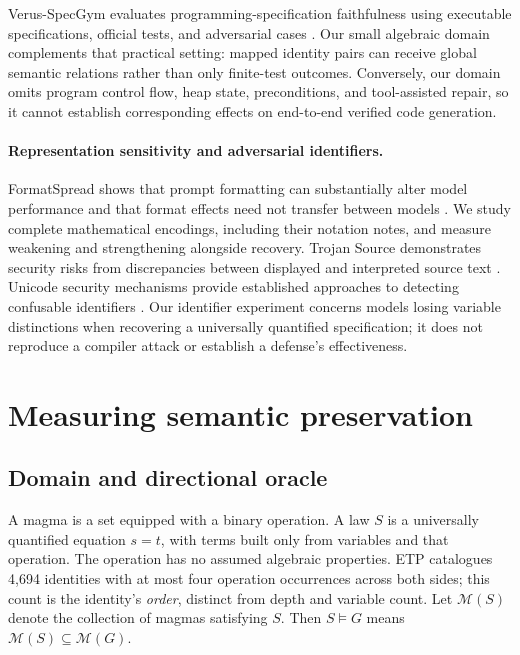 \documentclass{article}
\begin{document}
Verus-SpecGym evaluates programming-specification faithfulness using executable
specifications, official tests, and adversarial cases
\citep{agarwal2026specgym}. Our small algebraic domain complements that practical
setting: mapped identity pairs can receive global semantic relations rather
than only finite-test outcomes. Conversely, our domain omits program control
flow, heap state, preconditions, and tool-assisted repair, so it cannot establish
corresponding effects on end-to-end verified code generation.

\paragraph{Representation sensitivity and adversarial identifiers.}
FormatSpread shows that prompt formatting can substantially alter model
performance and that format effects need not transfer between models
\citep{sclar2024format}. We study complete mathematical encodings, including
their notation notes, and measure weakening and strengthening alongside recovery.
Trojan Source demonstrates security risks from discrepancies between displayed
and interpreted source text \citep{boucher2023trojan}. Unicode security mechanisms
provide established approaches to detecting confusable identifiers
\citep{unicode2025security}. Our identifier experiment concerns models losing
variable distinctions when recovering a universally quantified specification;
it does not reproduce a compiler attack or establish a defense's effectiveness.

\section{Measuring semantic preservation}
\label{sec:measurement}

\subsection{Domain and directional oracle}

A magma is a set equipped with a binary operation. A law $S$ is a universally
quantified equation $s=t$, with terms built only from variables and that
operation. The operation has no assumed algebraic properties. ETP catalogues
4,694 identities with at most four operation occurrences across both sides;
this count is the identity's \emph{order}, distinct from depth and variable
count. Let $\mathcal{M}(S)$ denote the collection of magmas satisfying $S$.
Then $S\models G$ means
$\mathcal{M}(S)\subseteq\mathcal{M}(G)$.
\end{document}
